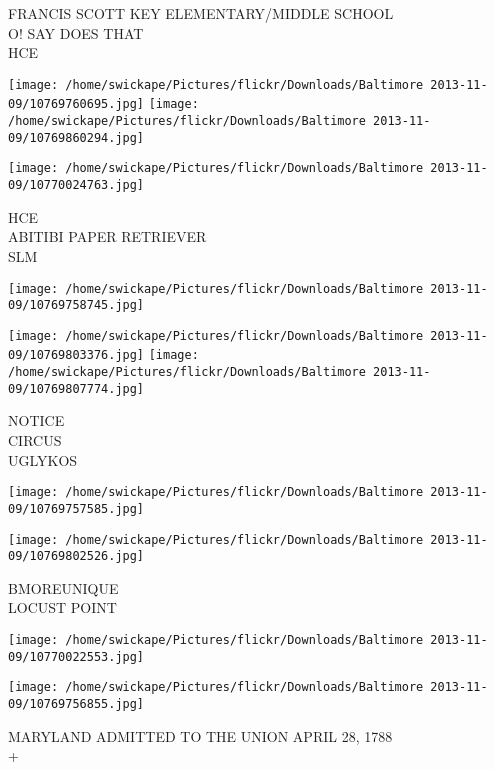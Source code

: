 \documentclass[10pt,letterpaper]{article}
\begin{document}
FRANCIS SCOTT KEY ELEMENTARY/MIDDLE SCHOOL\\
O! SAY DOES THAT\\
HCE\\
\pagebreak

\texttt{[image: /home/swickape/Pictures/flickr/Downloads/Baltimore 2013-11-09/10769760695.jpg]}
\texttt{[image: /home/swickape/Pictures/flickr/Downloads/Baltimore 2013-11-09/10769860294.jpg]}

\vspace{0.25in}
\texttt{[image: /home/swickape/Pictures/flickr/Downloads/Baltimore 2013-11-09/10770024763.jpg]}

HCE\\
ABITIBI PAPER RETRIEVER\\
SLM\\
\pagebreak

\texttt{[image: /home/swickape/Pictures/flickr/Downloads/Baltimore 2013-11-09/10769758745.jpg]}

\vspace{0.25in}
\texttt{[image: /home/swickape/Pictures/flickr/Downloads/Baltimore 2013-11-09/10769803376.jpg]}
\texttt{[image: /home/swickape/Pictures/flickr/Downloads/Baltimore 2013-11-09/10769807774.jpg]}

NOTICE\\
CIRCUS\\
UGLYKOS\\
\pagebreak

\texttt{[image: /home/swickape/Pictures/flickr/Downloads/Baltimore 2013-11-09/10769757585.jpg]}

\vspace{0.25in}
\texttt{[image: /home/swickape/Pictures/flickr/Downloads/Baltimore 2013-11-09/10769802526.jpg]}

BMOREUNIQUE\\
LOCUST POINT\\
\pagebreak

\texttt{[image: /home/swickape/Pictures/flickr/Downloads/Baltimore 2013-11-09/10770022553.jpg]}

\vspace{0.25in}
\texttt{[image: /home/swickape/Pictures/flickr/Downloads/Baltimore 2013-11-09/10769756855.jpg]}

MARYLAND ADMITTED TO THE UNION APRIL 28, 1788\\
+\\
\pagebreak
\end{document}
